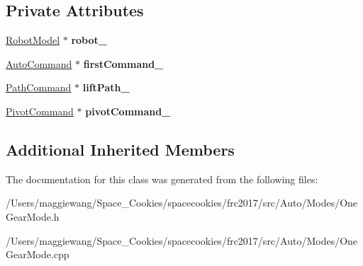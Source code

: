 \subsection*{Private Attributes}
\begin{DoxyCompactItemize}
\item 
\mbox{\label{class_one_gear_mode_ad1b467771c98dc4e3156aea381390a00}} 
\hyperlink{class_robot_model}{Robot\+Model} $\ast$ {\bfseries robot\+\_\+}
\item 
\mbox{\label{class_one_gear_mode_ad7d249a36949edf64d23759c626e4c98}} 
\hyperlink{class_auto_command}{Auto\+Command} $\ast$ {\bfseries first\+Command\+\_\+}
\item 
\mbox{\label{class_one_gear_mode_ac943774ff57a1a71e70edb174ed57d17}} 
\hyperlink{class_path_command}{Path\+Command} $\ast$ {\bfseries lift\+Path\+\_\+}
\item 
\mbox{\label{class_one_gear_mode_acb1c16247a5f912b85a3951fd91b82cd}} 
\hyperlink{class_pivot_command}{Pivot\+Command} $\ast$ {\bfseries pivot\+Command\+\_\+}
\end{DoxyCompactItemize}
\subsection*{Additional Inherited Members}


The documentation for this class was generated from the following files\+:\begin{DoxyCompactItemize}
\item 
/\+Users/maggiewang/\+Space\+\_\+\+Cookies/spacecookies/frc2017/src/\+Auto/\+Modes/One\+Gear\+Mode.\+h\item 
/\+Users/maggiewang/\+Space\+\_\+\+Cookies/spacecookies/frc2017/src/\+Auto/\+Modes/One\+Gear\+Mode.\+cpp\end{DoxyCompactItemize}
